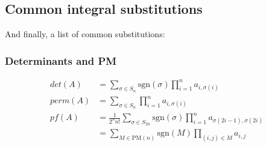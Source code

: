   \subsection{Common integral substitutions} And finally, a list of common substitutions:

      \subsubsection{Determinants and PM}
                \begin{align*}
                    det(A) &= \sum_{\sigma \in S_n}\text{sgn}(\sigma)\prod_{i = 1}^n a_{i,\sigma(i)}\\
                    perm(A) &= \sum_{\sigma \in S_n} \prod_{i = 1}^n a_{i,\sigma(i)}\\
                    pf(A) &= \frac{1}{2^nn!}\sum_{\sigma \in S_{2n}} \text{sgn}(\sigma)\prod_{i = 1}^n a_{\sigma(2i-1),\sigma(2i)}\\ &= \sum_{M \in \text{PM}(n)} \text{sgn}(M) \prod_{(i,j) \in M} a_{i,j}
                \end{align*}